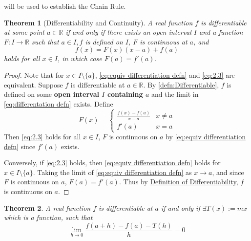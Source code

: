 \documentclass[11pt, oneside]{book}
\theoremstyle{break}
\newtheorem{thm}{Theorem}[section]
\newtheorem*{proof}{Proof}
\newcommand{\bb}[1]{\mathbb{#1}}			%
\begin{document}
will be used to establish the Chain Rule.

\begin{thm}[Differentiability and Continuity]\label{thm:Differentiability and Continuity}
    A real function $f$ is differentiable at some point $a \in \bb{R}$ if and only if there exists an open interval $I$ and a function $F : I \to \bb{R}$ such that $a \in I, f$ is defined on $I$, $F$ is continuous at $a$, and
    \begin{equation}\label{eq:2.3}
        f(x) = F(x)(x - a) + f(a)
    \end{equation}
    holds for all $x \in I$, in which case $F(a) = f'(a)$.
\end{thm}

\begin{proof}
    Note that for $x \in I \setminus \{a\}$, \autoref{eq:equiv differentiation defn} and \autoref{eq:2.3} are equivalent. Suppose $f$ is differentiable at $a \in \bb{R}$. By \autoref{defn:Differentiable}, $f$ is defined on some \textbf{open interval $I$ containing $a$} and the limit in \autoref{eq:differentation defn} exists. Define
    \begin{equation*}
        F(x) = \begin{cases}
            \frac{f(x) - f(a)}{x - a}   &   x \neq a \\
            f'(a)                       &   x = a
        \end{cases}
    \end{equation*}
    Then \autoref{eq:2.3} holds for all $x \in I$, $F$ is continuous on $a$ by \autoref{eq:equiv differentiation defn} since $f'(a)$ exists.

    Conversely, if \autoref{eq:2.3} holds, then \autoref{eq:equiv differentiation defn} holds for $x \in I \setminus \{a\}$. Taking the limit of \autoref{eq:equiv differentiation defn} as $x \to a$, and since $F$ is continuous on $a$, $F(a) = f'(a)$. Thus by \hyperref[defn:Differentiable]{Definition of Differentiability}, $f$ is continuous on $a$.
\end{proof}

\begin{thm}
    A real function $f$ is differentiable at $a$ if and only if $\exists T(x) := mx$ which is a function, such that
    \begin{equation}\label{eq:2.4}
        \lim_{h \to 0} \frac{f(a + h) - f(a) - T(h)}{h} = 0
    \end{equation}
\end{thm}
\end{document}

